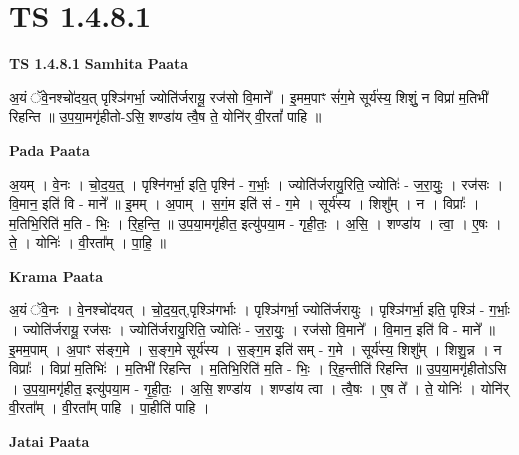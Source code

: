\documentclass[17pt]{extarticle}
\begin{document}
\section{ TS 1.4.8.1 }

\textbf{TS 1.4.8.1 } \newline
\textbf{Samhita Paata} \newline

अ॒यं ॅवे॒नश्चो॑दय॒त् पृश्ञि॑गर्भा॒ ज्योति॑र्जरायू॒ रज॑सो वि॒माने᳚ । इ॒मम॒पाꣳ सं॑ग॒मे सूर्य॑स्य॒ शिशुं॒ न विप्रा॑ म॒तिभी॑ रिहन्ति ॥ उ॒प॒या॒मगृ॑हीतो-ऽसि॒ शण्डा॑य त्वै॒ष ते॒ योनि॑र् वी॒रतां᳚ पाहि ॥ \newline

\textbf{Pada Paata} \newline

अ॒यम् । वे॒नः । चो॒द॒य॒त्॒ । पृश्नि॑गर्भा॒ इति॒ पृश्नि॑ - ग॒र्भाः॒ । ज्योति॑र्जरायु॒रिति॒ ज्योतिः॑ - ज॒रा॒युः॒ । रज॑सः । वि॒मान॒ इति॑ वि - माने᳚ ॥ इ॒मम् । अ॒पाम् । स॒गं॒म इति॑ सं - ग॒मे । सूर्य॑स्य । शिशु᳚म् । न । विप्राः᳚ । म॒तिभि॒रिति॑ म॒ति - भिः॒ । रि॒ह॒न्ति॒ ॥ उ॒प॒या॒मगृ॑हीत॒ इत्यु॑पया॒म - गृही॒तः॒ । अ॒सि॒ । शण्डा॑य । त्वा॒ । ए॒षः । ते॒ । योनिः॑ । वी॒रता᳚म् । पा॒हि॒ ॥  \newline


\textbf{Krama Paata} \newline

अ॒यं ॅवे॒नः । वे॒नश्चो॑दयत् । चो॒द॒य॒त्,पृश्ञि॑गर्भाः । पृश्ञि॑गर्भा॒ ज्योति॑र्जरायुः । पृश्ञि॑गर्भा॒ इति॒ पृश्ञि॑ - ग॒र्भाः॒ । ज्योति॑र्जरायू॒ रज॑सः । ज्योति॑र्जरायु॒रिति॒ ज्योतिः॑ - ज॒रा॒युः॒ । रज॑सो वि॒माने᳚ । वि॒मान॒ इति॑ वि - माने᳚ ॥ इ॒मम॒पाम् । अ॒पाꣳ स॑ङ्ग॒मे । स॒ङ्ग॒मे सूर्य॑स्य । स॒ङ्ग॒म इति॑ सम् - ग॒मे । सूर्य॑स्य॒ शिशु᳚म् । शिशु॒न्न । न विप्राः᳚ । विप्रा॑ म॒तिभिः॑ । म॒तिभी॑ रिहन्ति । म॒तिभि॒रिति॑ म॒ति - भिः॒ । रि॒ह॒न्तीति॑ रिहन्ति ॥ उ॒प॒या॒मगृ॑हीतोऽसि । उ॒प॒या॒मगृ॑हीत॒ इत्यु॑पया॒म - गृ॒ही॒तः॒ । अ॒सि॒ शण्डा॑य । शण्डा॑य त्वा । त्वै॒षः । ए॒ष ते᳚ । ते॒ योनिः॑ । योनि॑र् वी॒रता᳚म् । वी॒रता᳚म् पाहि । पा॒हीति॑ पाहि । \newline

\textbf{Jatai Paata} \newline
\end{document}
